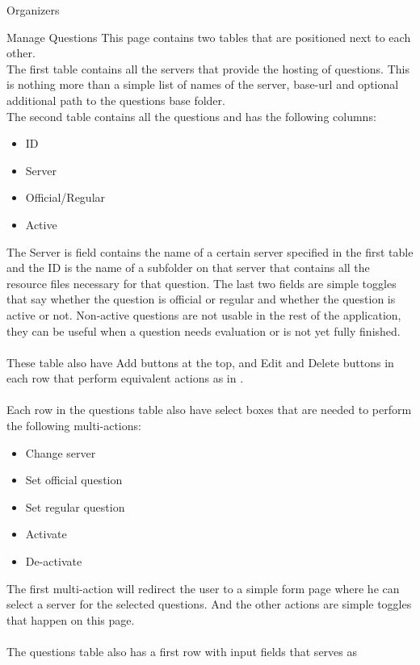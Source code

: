 \begin{section}{Organizers}
	\begin{subsection}{Manage Questions}
		This page contains two tables that are positioned next to each other. \\
		The first table contains all the servers that provide the hosting of questions.
		This is nothing more than a simple list of names of the server, base-url and
		optional additional path to the questions base folder. \\
		The second table contains all the questions and has the following columns:
		\begin{itemize}
			\item ID
			\item Server
			\item Official/Regular
			\item Active
		\end{itemize}
		The Server is field contains the name of a certain server specified in the first
		table and the ID is the name of a subfolder on that server that contains all the
		resource files necessary for that question.
		The last two fields are simple toggles that say whether the question is official
		or regular and whether the question is active or not. Non-active questions are
		not usable in the rest of the application, they can be useful when a question
		needs evaluation or is not yet fully finished. \\
		\\
		These table also have Add buttons at the top, and Edit and Delete buttons in each
		row that perform equivalent actions as in .
		\\
		\\
		Each row in the questions table also have select boxes that are needed to perform
		the following multi-actions:
		\begin{itemize}
			\item Change server
			\item Set official question
			\item Set regular question
			\item Activate
			\item De-activate
		\end{itemize}
		The first multi-action will redirect the user to a simple form page where he can
		select a server for the selected questions. And the other actions are simple
		toggles that happen on this page.\\
		\\
		The questions table also has a first row with input fields that serves as

\end{subsection}
\end{section}
